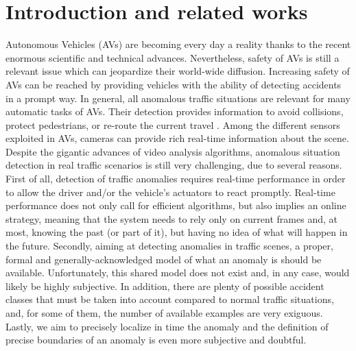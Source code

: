 \section{Introduction and related works}

Autonomous Vehicles (AVs) are becoming every day a reality thanks to the recent enormous scientific and technical advances.
Nevertheless, safety of AVs is still a relevant issue which can jeopardize their world-wide diffusion.
Increasing safety of AVs can be reached by providing vehicles with the ability of detecting accidents in a prompt way.
In general, all anomalous traffic situations are relevant for many automatic tasks of AVs.
Their detection provides information to avoid collisions, protect pedestrians, or re-route the current travel \cite{4298901}.
Among the different sensors exploited in AVs, cameras can provide rich real-time information about the scene.
Despite the gigantic advances of video analysis algorithms, anomalous situation detection in real traffic scenarios is still very challenging, due to several reasons.
First of all, detection of traffic anomalies requires real-time performance in order to allow the driver and/or the vehicle's actuators to react promptly.
Real-time performance does not only call for efficient algorithms, but also implies an online strategy, meaning that the system needs to rely only on current frames and, at most, knowing the past (or part of it), but having no idea of what will happen in the future.
Secondly, aiming at detecting anomalies in traffic scenes, a proper, formal and generally-acknowledged model of what an anomaly is should be available.
Unfortunately, this shared model does not exist and, in any case, would likely be highly subjective.
In addition, there are plenty of possible accident classes that must be taken into account compared to normal traffic situations, and, for some of them, the number of available examples are very exiguous.
Lastly, we aim to precisely localize in time the anomaly and the definition of precise boundaries of an anomaly is even more subjective and doubtful.
